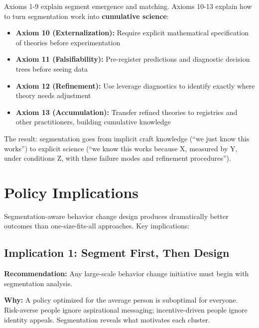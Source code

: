 \begin{tcolorbox}[colback=cyan!10!white, colframe=cyan!75!black]

Axioms 1-9 explain segment emergence and matching. Axioms 10-13 explain how to turn segmentation work into \textbf{cumulative science}:

\begin{itemize}[nosep]
\item \textbf{Axiom 10 (Externalization):} Require explicit mathematical specification of theories before experimentation
\item \textbf{Axiom 11 (Falsifiability):} Pre-register predictions and diagnostic decision trees before seeing data
\item \textbf{Axiom 12 (Refinement):} Use leverage diagnostics to identify exactly where theory needs adjustment
\item \textbf{Axiom 13 (Accumulation):} Transfer refined theories to registries and other practitioners, building cumulative knowledge
\end{itemize}

The result: segmentation goes from implicit craft knowledge (``we just know this works'') to explicit science (``we know this works because X, measured by Y, under conditions Z, with these failure modes and refinement procedures'').

\end{tcolorbox}

\section{Policy Implications}
\label{sec:policy-implications}

Segmentation-aware behavior change design produces dramatically better outcomes
than one-size-fits-all approaches. Key implications:

\subsection{Implication 1: Segment First, Then Design}

\textbf{Recommendation:} Any large-scale behavior change initiative must begin with
segmentation analysis.

\textbf{Why:} A policy optimized for the average person is suboptimal for everyone.
Risk-averse people ignore aspirational messaging; incentive-driven people ignore
identity appeals. Segmentation reveals what motivates each cluster.

